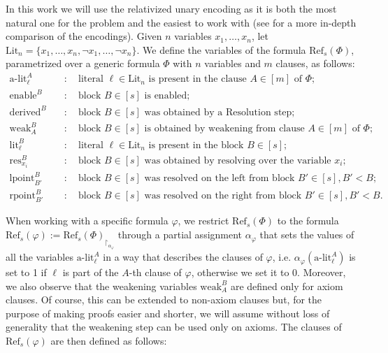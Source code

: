 In this work we will use the relativized unary encoding as it is both the most natural one for the problem and the easiest to work with (see \cite{pap} for a more in-depth comparison of the encodings). Given $n$ variables $x_1, \ldots, x_n$, let $\mathrm{Lit}_n = \{x_1, \ldots, x_n, \lnot x_1, \ldots, \lnot x_n\}$. We define the variables of the formula $\mathrm{Ref}_s(\Phi)$, parametrized over a generic formula $\Phi$ with $n$ variables and $m$ clauses, as follows:
\begin{align*}
    \text{a-lit}_\ell^A \quad & : \quad \text{literal } \ell \in \text{Lit}_n \text{ is present in the clause } A \in [m] \text{ of } \Phi; \\
    \text{enable}^B \quad & : \quad \text{block } B \in [s] \text{ is enabled}; \\
    \text{derived}^B \quad & : \quad \text{block } B \in [s] \text{ was obtained by a Resolution step}; \\
    \text{weak}_A^B \quad & : \quad \text{block } B \in [s] \text{ is obtained by weakening from clause } A \in [m] \text{ of } \Phi; \\
    \text{lit}_\ell^B \quad & : \quad \text{literal } \ell \in \text{Lit}_n \text{ is present in the block } B \in [s]; \\
    \text{res}_{x_i}^B \quad & : \quad \text{block } B \in [s] \text{ was obtained by resolving over the variable } x_i; \\
    \text{lpoint}_{B'}^B \quad & : \quad \text{block } B \in [s] \text{ was resolved on the left from block } B' \in [s], B' < B; \\
    \text{rpoint}_{B'}^B \quad & : \quad \text{block } B \in [s] \text{ was resolved on the right from block } B' \in [s], B' < B.
\end{align*}

When working with a specific formula $\varphi$, we restrict $\mathrm{Ref}_s(\Phi)$ to the formula $\mathrm{Ref}_s(\varphi) := \mathrm{Ref}_s(\Phi)_{\upharpoonright_{\alpha_\varphi}}$ through a partial assignment $\alpha_\varphi$ that sets the values of all the variables $\text{a-lit}_\ell^A$ in a way that describes the clauses of $\varphi$, i.e. $\alpha_\varphi(\text{a-lit}_\ell^A)$ is set to 1 if $\ell$ is part of the $A$-th clause of $\varphi$, otherwise we set it to 0. 
Moreover, we also observe that the weakening variables $\text{weak}_A^B$ are defined only for axiom clauses. Of course, this can be extended to non-axiom clauses but, for the purpose of making proofs easier and shorter, we will assume without loss of generality that the weakening step can be used only on axioms. The clauses of $\mathrm{Ref}_s(\varphi)$ are then defined as follows:

